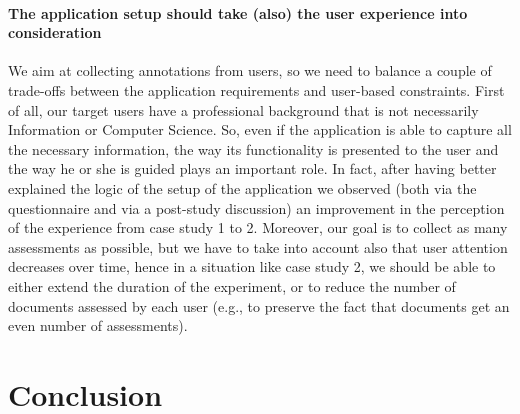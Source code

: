 \documentclass{llncs}
\begin{document}
\paragraph{{\bf The application setup should take (also) the user experience into consideration}}
We aim at collecting annotations from users, so we need to balance a couple of trade-offs between the application requirements and user-based constraints. First of all, our target users have a professional background that is not necessarily Information or Computer Science. So, even if the application is able to capture all the necessary information, the way its functionality is presented to the user and the way he or she is guided plays an important role. In fact, after having better explained the logic of the setup of the application we observed (both via the questionnaire and via a post-study discussion) an improvement in the perception of the experience from case study 1 to 2. Moreover, our goal is to collect as many assessments as possible, but we have to take into account also that user attention decreases over time, hence in a situation like case study 2, we should be able to either extend the duration of the experiment, or to reduce the number of documents assessed by each user (e.g., to preserve the fact that documents get an even number of assessments). %
%
%
%

\section{Conclusion}
\label{sec:conclusion}
\end{document}
